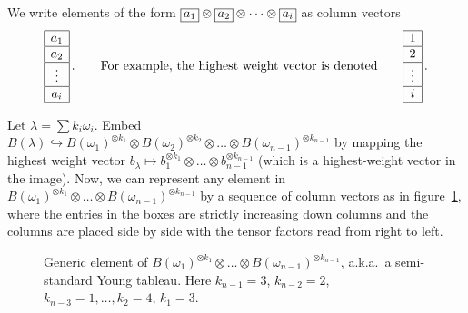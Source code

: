 We write elements of the form
$\bx{a_1} \otimes \bx{a_2} \otimes \dots \otimes \bx{a_i}$ as column vectors
\[
  \begin{array}{|c|} \hline a_1 \\ \hline a_2 \\ \hline \vdots \\ \hline a_i \\ \hline \end{array}\,.
  \qquad\text{For example, the highest weight vector is denoted}\qquad
  \begin{array}{|c|} \hline 1 \\ \hline 2 \\ \hline \vdots \\ \hline i \\ \hline \end{array}\,.
\]

Let $\lambda = \sum k_i\omega_i$. Embed
$B(\lambda) \hookrightarrow B(\omega_1)^{\otimes k_1} \otimes B(\omega_2)^{\otimes k_2}
\otimes \dots \otimes B(\omega_{n-1})^{\otimes k_{n-1}}$ by mapping the highest
weight vector
$b_\lambda \mapsto b_1^{\otimes k_1} \otimes \dots \otimes b_{n-1}^{\otimes k_{n-1}}$
(which is a highest-weight vector in the image). Now, we can represent any
element in
$B(\omega_1)^{\otimes k_1} \otimes \dots \otimes B(\omega_{n-1})^{\otimes k_{n-1}}$
by a sequence of column vectors as in figure~\ref{fig:tableau}, where the
entries in the boxes are strictly increasing down columns and the columns are
placed side by side with the tensor factors read from right to left.

\begin{figure}[!htbp]
\centering
{}
\caption{Generic element of
$B(\omega_1)^{\otimes k_1} \otimes \dots \otimes B(\omega_{n-1})^{\otimes k_{n-1}}$,
a.k.a.\ a semi-standard Young tableau. Here $k_{n-1} = 3$, $k_{n-2} = 2$,
$k_{n-3} = 1, \dots, k_2 = 4$, $k_1 = 3$.}
\label{fig:tableau}
\end{figure}

